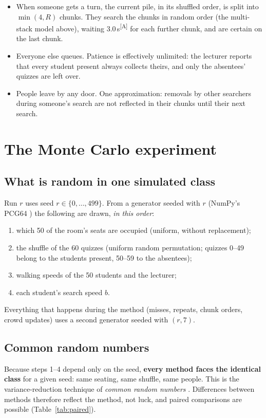 \documentclass[11pt,a4paper]{article}
\newcommand{\assume}{\textcolor{flag}{\textsuperscript{[A]}}}
\begin{document}
\begin{description}[style=nextline]
\begin{itemize}
    \item When someone gets a turn, the current pile, in its shuffled order, is split into $\min(4,R)$ chunks. They search the chunks in random order (the multi-stack model above), waiting 3.0\,s\assume{} for each further chunk, and are certain on the last chunk.
    \item Everyone else queues. Patience is effectively unlimited: the lecturer reports that every student present always collects theirs, and only the absentees' quizzes are left over.
    \item People leave by any door. One approximation: removals by other searchers during someone's search are not reflected in their chunks until their next search.
  \end{itemize}
\end{description}

\section{The Monte Carlo experiment}\label{sec:experiment}

\subsection{What is random in one simulated class}
Run $r$ uses seed $r\in\{0,\dots,499\}$. From a generator seeded with $r$ (NumPy's PCG64 \cite{oneill2014}) the following are drawn, \emph{in this order}:
\begin{enumerate}
  \item which 50 of the room's seats are occupied (uniform, without replacement);
  \item the shuffle of the 60 quizzes (uniform random permutation; quizzes 0--49 belong to the students present, 50--59 to the absentees);
  \item walking speeds of the 50 students and the lecturer;
  \item each student's search speed $b$.
\end{enumerate}
Everything that happens during the method (misses, repeats, chunk orders, crowd updates) uses a second generator seeded with $(r, 7)$.

\subsection{Common random numbers}
Because steps 1--4 depend only on the seed, \textbf{every method faces the identical class} for a given seed: same seating, same shuffle, same people. This is the variance-reduction technique of \emph{common random numbers} \cite{law2015}. Differences between methods therefore reflect the method, not luck, and paired comparisons are possible (Table~\ref{tab:paired}).
\end{document}
